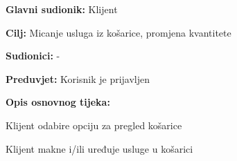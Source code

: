 				\noindent {}
				\begin{packed_item}
					
					\item \textbf{Glavni sudionik: } Klijent
					\item  \textbf{Cilj:} Micanje usluga iz košarice, promjena kvantitete
					\item  \textbf{Sudionici:} -
					\item  \textbf{Preduvjet:} Korisnik je prijavljen
					\item  \textbf{Opis osnovnog tijeka:}
					
					\item[] \begin{packed_enum}
						
						\item Klijent odabire opciju za pregled košarice
						\item Klijent makne i/ili uređuje usluge u košarici
						
					\end{packed_enum}
				
				\end{packed_item}
			
